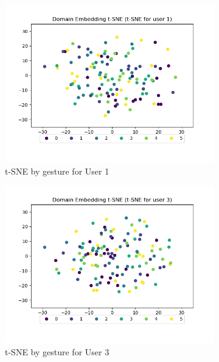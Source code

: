 \begin{figure}[b]
\begin{subfigure}{0.3\textwidth}
		\includegraphics[width=\textwidth]{figures/short/short_de_u1}
		\caption{t-SNE by gesture for User 1}
	\end{subfigure}
	\hfill
	\begin{subfigure}{0.3\textwidth}
		\centering
		\includegraphics[width=\textwidth]{figures/short/short_de_u3}
		\caption{t-SNE by gesture for User 3}
	\end{subfigure}
	\hfill
	\begin{subfigure}{0.3\textwidth}
		\centering

\end{subfigure}
\end{figure}
